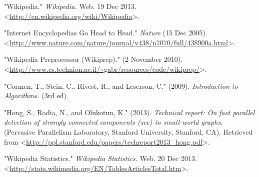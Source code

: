 \documentclass[twoside]{article}
\begin{document}
\begin{thebibliography}{99} %

 "Wikipedia." {\em Wikipedia.}
		Web. 19 Dec 2013. <\url{http://en.wikipedia.org/wiki/Wikipedia}>.
	
 "Internet Encyclopedias Go Head to Head." {\em Nature}
		(15 Dec 2005). <\url{http://www.nature.com/nature/journal/v438/n7070/full/438900a.html}>.

 "Wikipedia Preprocessor (Wikiprep)."
	(2 November 2010). <\url{http://www.cs.technion.ac.il/~gabr/resources/code/wikiprep/}>.

 "Cormen, T., Stein, C., Rivest, R., and Leserson, C." (2009).
	 {\em Introduction to Algorithms.} (3rd ed).
	
 "Hong, S., Rodia, N., and Olukotun, K." (2013).
	{\em Technical report: On fast parallel detection of strongly connected components (scc) in small-world graphs}.
	(Pervasive Parallelism Laboratory, Stanford University, Stanford, CA).
	Retrieved from <\url{http://ppl.stanford.edu/papers/techreport2013_hong.pdf}>.
	
 "Wikipedia Statistics." {\em Wikipedia Statistics.}
		Web. 20 Dec 2013. <\url{http://stats.wikimedia.org/EN/TablesArticlesTotal.htm}>.



\end{thebibliography}

\end{document}
